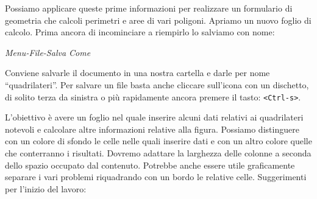 \begin{esempio}
Possiamo applicare queste prime informazioni per realizzare un formulario di
geometria che calcoli perimetri e aree di vari poligoni.
Apriamo un nuovo foglio di calcolo. Prima ancora di incominciare a riempirlo
lo salviamo con nome:

\emph{Menu-File-Salva Come}

Conviene salvarle il documento
in una nostra cartella e darle per nome ``quadrilateri''.
Per salvare un file basta anche cliccare sull'icona con un dischetto,
di solito terza da sinistra o più rapidamente ancora premere il tasto:
\texttt{\textless{}Ctrl-s\textgreater{}}.

L'obiettivo è avere un foglio nel quale inserire alcuni dati relativi ai
quadrilateri notevoli e calcolare altre informazioni relative alla figura.
Possiamo distinguere con un colore di sfondo le celle nelle quali inserire
dati e con un altro colore quelle che conterranno i risultati.
Dovremo adattare la larghezza delle colonne a seconda dello spazio occupato
dal contenuto.
Potrebbe anche essere utile graficamente separare i vari problemi
riquadrando con un bordo le relative celle.
Suggerimenti per l'inizio del lavoro:


\end{esempio}
